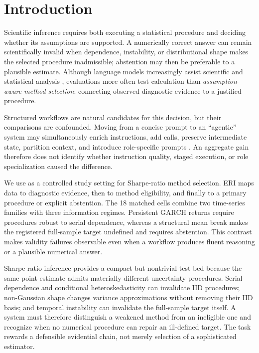 \section{Introduction}
\label{sec:introduction}

Scientific inference requires both executing a statistical procedure and
deciding whether its assumptions are supported.  A numerically correct answer
can remain scientifically invalid when dependence, instability, or
distributional shape makes the selected procedure inadmissible; abstention may
then be preferable to a plausible estimate.  Although language models
increasingly assist scientific and statistical analysis
\citep{GuEtAl2024BLADE,LiuEtAl2024QRData}, evaluations more often test
calculation than \emph{assumption-aware method selection}: connecting observed
diagnostic evidence to a justified procedure.

Structured workflows are natural candidates for this decision, but their
comparisons are confounded.  Moving from a concise prompt to an ``agentic''
system may simultaneously enrich instructions, add calls, preserve
intermediate state, partition context, and introduce role-specific prompts
\citep{YaoEtAl2023ReAct,HongEtAl2024MetaGPT}.  An aggregate gain therefore
does not identify whether instruction quality, staged execution, or role
specialization caused the difference.

We use \ERI{} as a controlled study setting for Sharpe-ratio method selection.
ERI maps data to diagnostic evidence, then to method eligibility, and finally
to a primary procedure or explicit abstention.  The 18 matched cells combine
two time-series families with three information regimes.  Persistent GARCH
returns require procedures robust to serial dependence, whereas a structural
mean break makes the registered full-sample target undefined and requires
abstention.  This contrast makes validity failures observable even when a
workflow produces fluent reasoning or a plausible numerical answer.

Sharpe-ratio inference provides a compact but nontrivial test bed because the
same point estimate admits materially different uncertainty procedures.
Serial dependence and conditional heteroskedasticity can invalidate IID
procedures; non-Gaussian shape changes variance approximations without
removing their IID basis; and temporal instability can invalidate the
full-sample target itself.  A system must therefore distinguish a weakened
method from an ineligible one and recognize when no numerical procedure can
repair an ill-defined target.  The task rewards a defensible evidential chain,
not merely selection of a sophisticated estimator.

